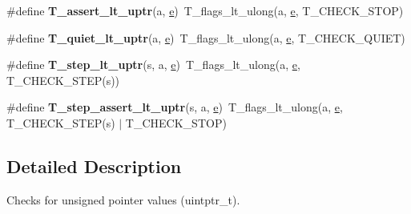\begin{DoxyCompactItemize}
\item 
\mbox{\label{group__RTEMSTestFrameworkChecksUIntptr_ga9dbf136e34918aa9bda3b7f42e00c405}} 
\#define {\bfseries T\+\_\+assert\+\_\+lt\+\_\+uptr}(a,  \mbox{\hyperlink{sun4u_2tte_8h_a8b0b9ed08e0e18920ec2682f48228c27}{e}})~T\+\_\+flags\+\_\+lt\+\_\+ulong(a, \mbox{\hyperlink{sun4u_2tte_8h_a8b0b9ed08e0e18920ec2682f48228c27}{e}}, T\+\_\+\+C\+H\+E\+C\+K\+\_\+\+S\+T\+OP)
\item 
\mbox{\label{group__RTEMSTestFrameworkChecksUIntptr_gadd396edd0ba250d74cbc970f1bc7af2c}} 
\#define {\bfseries T\+\_\+quiet\+\_\+lt\+\_\+uptr}(a,  \mbox{\hyperlink{sun4u_2tte_8h_a8b0b9ed08e0e18920ec2682f48228c27}{e}})~T\+\_\+flags\+\_\+lt\+\_\+ulong(a, \mbox{\hyperlink{sun4u_2tte_8h_a8b0b9ed08e0e18920ec2682f48228c27}{e}}, T\+\_\+\+C\+H\+E\+C\+K\+\_\+\+Q\+U\+I\+ET)
\item 
\mbox{\label{group__RTEMSTestFrameworkChecksUIntptr_ga0fd69a0b1939e27f12b0bf4217039572}} 
\#define {\bfseries T\+\_\+step\+\_\+lt\+\_\+uptr}(s,  a,  \mbox{\hyperlink{sun4u_2tte_8h_a8b0b9ed08e0e18920ec2682f48228c27}{e}})~T\+\_\+flags\+\_\+lt\+\_\+ulong(a, \mbox{\hyperlink{sun4u_2tte_8h_a8b0b9ed08e0e18920ec2682f48228c27}{e}}, T\+\_\+\+C\+H\+E\+C\+K\+\_\+\+S\+T\+EP(s))
\item 
\mbox{\label{group__RTEMSTestFrameworkChecksUIntptr_ga6422a53eac376e3babac9f23d1a181c4}} 
\#define {\bfseries T\+\_\+step\+\_\+assert\+\_\+lt\+\_\+uptr}(s,  a,  \mbox{\hyperlink{sun4u_2tte_8h_a8b0b9ed08e0e18920ec2682f48228c27}{e}})~T\+\_\+flags\+\_\+lt\+\_\+ulong(a, \mbox{\hyperlink{sun4u_2tte_8h_a8b0b9ed08e0e18920ec2682f48228c27}{e}}, T\+\_\+\+C\+H\+E\+C\+K\+\_\+\+S\+T\+EP(s) $\vert$ T\+\_\+\+C\+H\+E\+C\+K\+\_\+\+S\+T\+OP)
\end{DoxyCompactItemize}


\subsection{Detailed Description}
Checks for unsigned pointer values (uintptr\+\_\+t). 

